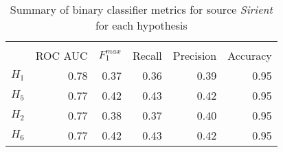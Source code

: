 \begin{table}[htbp!] \centering
\caption{Summary of binary classifier metrics for source \textit{Sirient} for each hypothesis}
\label{tab:421_metrics_summary_Sirient}
\begin{tabular}{lrrrrr}
\\[-1.8ex]\hline\hline \\[-1.8ex]
 & ROC AUC & $F_1^{max}$ & Recall & Precision & Accuracy \\
\midrule
$H_1$ & 0.78 & 0.37 & 0.36 & 0.39 & 0.95 \\
$H_5$ & 0.77 & 0.42 & 0.43 & 0.42 & 0.95 \\
$H_2$ & 0.77 & 0.38 & 0.37 & 0.40 & 0.95 \\
$H_6$ & 0.77 & 0.42 & 0.43 & 0.42 & 0.95 \\
\bottomrule
\end{tabular}
\end{table}
